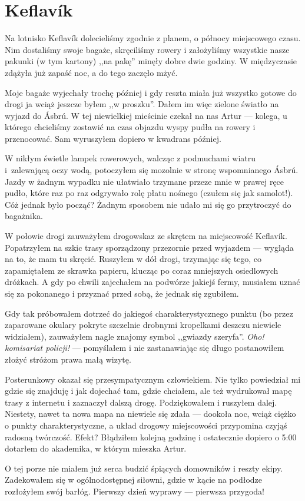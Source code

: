 \section*{Keflavík}

Na lotnisko Keflavík dolecieliśmy zgodnie z planem, o północy miejscowego czasu. Nim dostaliśmy swoje bagaże, skręciliśmy rowery i założyliśmy wszystkie nasze pakunki (w tym kartony) ,,na pakę'' minęły dobre dwie godziny. W międzyczasie zdążyła już zapaść noc, a do tego zaczęło mżyć.

Moje bagaże wyjechały trochę później i gdy reszta miała już wszystko gotowe do drogi ja wciąż jeszcze byłem ,,w proszku''. Dałem im więc zielone światło na wyjazd do Ásbrú. W tej niewielkiej mieścinie czekał na nas Artur --- kolega, u którego chcieliśmy zostawić na czas objazdu wyspy pudła na rowery i przenocować. Sam wyruszyłem dopiero w kwadrans później.

W nikłym świetle lampek rowerowych, walcząc z podmuchami wiatru i~zalewającą oczy wodą, potoczyłem się mozolnie w stronę wspomnianego Ásbrú. Jazdy w żadnym wypadku nie ułatwiało trzymane przeze mnie w prawej ręce pudło, które raz po raz odgrywało rolę płatu nośnego (czułem się jak samolot!). Cóż jednak było począć? Żadnym sposobem nie udało mi się go przytroczyć do bagażnika.

W połowie drogi zauważyłem drogowskaz ze skrętem na miejscowość Keflavík. Popatrzyłem na szkic trasy sporządzony przezornie przed wyjazdem --- wygląda na to, że mam tu skręcić. Ruszyłem w dół drogi, trzymając się tego, co zapamiętałem ze skrawka papieru, klucząc po coraz mniejszych osiedlowych dróżkach. A gdy po chwili zajechałem na podwórze jakiejś fermy, musiałem uznać się za pokonanego i przyznać przed sobą, że jednak się zgubiłem.

Gdy tak próbowałem dotrzeć do jakiegoś charakterystycznego punktu (bo przez zaparowane okulary pokryte szczelnie drobnymi kropelkami deszczu niewiele widziałem), zauważyłem nagle znajomy symbol ,,gwiazdy szeryfa''. \emph{Oho! komisariat policji!} --- pomyślałem i nie zastanawiając się długo postanowiłem złożyć stróżom prawa małą wizytę.

Posterunkowy okazał się przesympatycznym człowiekiem. Nie tylko powiedział mi gdzie się znajduję i jak dojechać tam, gdzie chciałem, ale też wydrukował mapę trasy z internetu i zaznaczył dalszą drogę. Podziękowałem i ruszyłem dalej. Niestety, nawet ta nowa mapa na niewiele się zdała --- dookoła noc, wciąż ciężko o punkty charakterystyczne, a układ drogowy miejscowości przypomina czyjąś radosną twórczość. Efekt? Błądziłem kolejną godzinę i ostatecznie dopiero o 5:00 dotarłem do akademika, w którym mieszka Artur.

O tej porze nie miałem już serca budzić śpiących domowników i reszty ekipy. Zadekowałem się w ogólnodostępnej siłowni, gdzie w kącie na podłodze rozłożyłem swój barłóg. Pierwszy dzień wyprawy --- pierwsza przygoda!